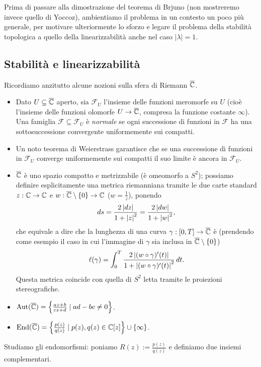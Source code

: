 Prima di passare alla dimostrazione del teorema di Brjuno (non mostreremo invece quello di Yoccoz), ambientiamo il problema in un contesto un poco più generale, per motivare ulteriormente lo sforzo e legare il problema della stabilità topologica a quello della linearizzabilità anche nel caso $|\lambda|=1$.

\subsection{Stabilità e linearizzabilità}

Ricordiamo anzitutto alcune nozioni sulla sfera di Riemann $\overline{\mathbb{C}}$. 
\begin{itemize}
 \item Dato $U\subseteq\overline{\mathbb{C}}$ aperto, sia $\mathcal{F}_U$ l'insieme delle funzioni meromorfe su $U$
      (cioè l'insieme delle funzioni olomorfe $U\to\overline{\mathbb{C}}$, compresa la funzione costante $\infty$).
      Una famiglia $\mathcal{F}\subseteq\mathcal{F}_U$ è \emph{normale} se ogni successione di funzioni in $\mathcal{F}$
      ha una sottosuccessione convergente uniformemente sui compatti.
 \item Un noto teorema di Weierstrass garantisce che se una successione di funzioni
      in $\mathcal{F}_U$ converge uniformemente sui compatti il suo limite è ancora in $\mathcal{F}_U$.
 \item $\overline{\mathbb{C}}$ è uno spazio compatto e metrizzabile (è omeomorfo a $S^2$);
      possiamo definire esplicitamente una metrica riemanniana tramite le due carte standard $z:\mathbb{C}\to\mathbb{C}$
      e $w:\overline{\mathbb{C}}\setminus\left\{0\right\}\to\mathbb{C}$ ($w=\frac{1}{z}$), ponendo
      \[ ds=\frac{2\left|dz\right|}{1+\left|z\right|^2}=\frac{2\left|dw\right|}{1+\left|w\right|^2}, \]
      che equivale a dire che la lunghezza di una curva $\gamma:[0,T]\to\overline{\mathbb{C}}$ è
      (prendendo come esempio il caso in cui l'immagine di $\gamma$ sia inclusa in $\overline{\mathbb{C}}\setminus\left\{0\right\}$)
      \[ \ell(\gamma)=\int_0^T \frac{2\left|(w\circ\gamma)'(t)\right|}{1+\left|(w\circ\gamma)'(t)\right|^2}\,dt. \]
      Questa metrica coincide con quella di $S^2$ letta tramite le proiezioni stereografiche.
 \item $\operatorname{Aut}(\overline{\mathbb{C}})=\left\{\frac{az+b}{cz+d}\mid ad-bc\neq 0\right\}$.
 \item $\operatorname{End}(\overline{\mathbb{C}})=\left\{\frac{p(z)}{q(z)}\mid p(z),q(z)\in\mathbb{C}[z]\right\}\cup\left\{\infty\right\}$.
\end{itemize}

Studiamo gli endomorfismi: poniamo $R(z):=\frac{p(z)}{q(z)}$ e definiamo due insiemi complementari.

